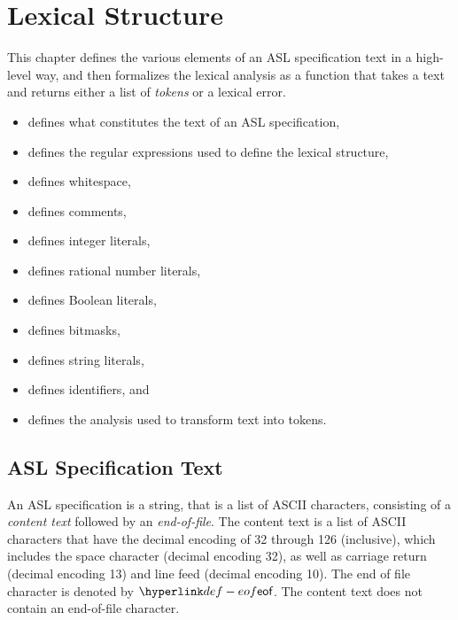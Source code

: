 \chapter{Lexical Structure\label{chap:LexicalStructure}}
This chapter defines the various elements of an ASL specification text in a high-level way,
and then formalizes the lexical analysis as a function that takes a text and returns
either a list of \emph{tokens} or a lexical error.

\ChapterOutline
\begin{itemize}
  \item {} defines what constitutes the text of an ASL specification,
  \item {} defines the regular expressions used to define the lexical structure,
  \item {} defines whitespace,
  \item {} defines comments,
  \item {} defines integer literals,
  \item {} defines rational number literals,
  \item {} defines Boolean literals,
  \item {} defines bitmasks,
  \item {} defines string literals,
  \item {} defines identifiers, and
  \item {} defines the analysis used to transform text into tokens.
\end{itemize}

\section{ASL Specification Text\label{sec:ASL Specification Text}}
An ASL specification is a string, that is a list of ASCII characters, consisting of a \emph{content text}
followed by an \emph{end-of-file}.
The content text is a list of
ASCII characters that have the decimal encoding of 32 through 126 (inclusive),
which includes the space character (decimal encoding 32),
as well as
carriage return (decimal encoding 13) and line feed (decimal encoding 10).
\hypertarget{def-eof}{}
The end of file character is denoted by $\eof$.
The content text does not contain an end-of-file character.

